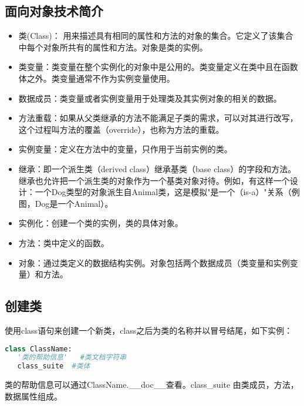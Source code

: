 \subsection{面向对象技术简介}
\begin{itemize}
\item 类(Class)： 用来描述具有相同的属性和方法的对象的集合。它定义了该集合中每个对象所共有的属性和方法。对象是类的实例。
\item 类变量：类变量在整个实例化的对象中是公用的。类变量定义在类中且在函数体之外。类变量通常不作为实例变量使用。
\item 数据成员：类变量或者实例变量用于处理类及其实例对象的相关的数据。
\item 方法重载：如果从父类继承的方法不能满足子类的需求，可以对其进行改写，这个过程叫方法的覆盖（override），也称为方法的重载。
\item 实例变量：定义在方法中的变量，只作用于当前实例的类。
\item 继承：即一个派生类（derived class）继承基类（base class）的字段和方法。继承也允许把一个派生类的对象作为一个基类对象对待。例如，有这样一个设计：一个Dog类型的对象派生自Animal类，这是模拟"是一个（is-a）"关系（例图，Dog是一个Animal）。
\item 实例化：创建一个类的实例，类的具体对象。
\item 方法：类中定义的函数。
\item 对象：通过类定义的数据结构实例。对象包括两个数据成员（类变量和实例变量）和方法。
\end{itemize}



\subsection{创建类}
使用class语句来创建一个新类，class之后为类的名称并以冒号结尾，如下实例：
\begin{lstlisting}[language=Python]
class ClassName:
   '类的帮助信息'   #类文档字符串
   class_suite  #类体
\end{lstlisting}
类的帮助信息可以通过ClassName.\_\_doc\_\_查看。class\_suite 由类成员，方法，数据属性组成。



